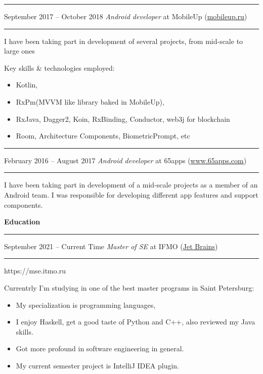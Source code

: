 \documentclass[11pt]{article}
\newcommand\CvSmallSkipLength{0.5em}
\newcommand\CvBigSkipLength{1em}
\newcommand\CvSkip[1]{\vspace{#1}}
\newcommand\CvSmallSkip{\CvSkip{\CvSmallSkipLength}}
\newcommand\CvBigSkip{\CvSkip{\CvBigSkipLength}}
\newcommand\CvSectionHeader[1]{\CvBigSkip\textbf{#1}\CvBigSkip}
\newcommand\CvRule{\begingroup\color{CvRuleColor}\hrule\endgroup}
\newcommand\CvWorkplaceHeader[5]{\begingroup%
	\CvRule%
	\fboxsep0pt%
	\colorbox{CvWorkplaceHeaderColor}{%
		\begin{minipage}{\linewidth-2\fboxsep}%
			\CvSmallSkip%
			#1 -- #2 \hfill \textit{#3} at #4 (\href{http://#5/}{#5})%
			\CvSmallSkip%
		\end{minipage}%
	}%
	\CvRule%
	\endgroup%
}
\newenvironment{CvWorkplaceDescription}{%
	\begingroup\setlength\parskip{\CvSmallSkipLength}%
}{%
	\CvSmallSkip\endgroup%
}
\begin{document}
	\CvWorkplaceHeader{September 2017}{October 2018}{Android developer}{MobileUp}{mobileup.ru}
	
	\begin{CvWorkplaceDescription}
		I have been taking part in development of several projects, from mid-scale to large ones
		
		Key skills \& technologies employed:
		\begin{itemize}[noitemsep]
			\item Kotlin,
			\item RxPm(MVVM like library baked in MobileUp),
			\item RxJava, Dagger2, Koin, RxBinding, Conductor, web3j for blockchain
			\item Room, Architecture Components, BiometricPrompt, etc
		\end{itemize}
	\end{CvWorkplaceDescription}
	
	\CvWorkplaceHeader{February 2016}{August 2017}{Android developer}{65apps}{www.65apps.com}
	
	\begin{CvWorkplaceDescription}
		I have been taking part in development of a mid-scale projects as a member of an Android team. I was responsible for developing different app features and support components.
	\end{CvWorkplaceDescription}
	
	\begin{LARGE}  
		\CvSectionHeader{Education}
	\end{LARGE} 
	
	
	\CvWorkplaceHeader{September 2021}{Current Time}{Master of SE}{IFMO}{Jet Brains}{https://mse.itmo.ru}
	
	\begin{CvWorkplaceDescription}
		Currentrly I'm studying in one of the best master programs in Saint Petersburg:
		\begin{itemize}[noitemsep]
			\item My specialization is programming languages,
			\item I enjoy Haskell, get a good taste of Python and C++, also reviewed my Java skills.
			\item Got more profound in software engineering in general.
			\item My current semester project is IntelliJ IDEA plugin.
		\end{itemize}
	\end{CvWorkplaceDescription}
	
\end{document}
